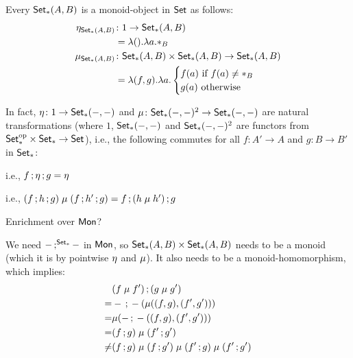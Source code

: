 \documentclass[runningheads,envcountsame]{llncs}
\begin{document}
Every $\mathsf{Set}_*(A, B)$ is a monoid-object in $\mathsf{Set}$ as follows:
\begin{align}
    \munit_{\homSetP{A}{B}} &\colon 1 \to \homSetP{A}{B} \\
                          &= \lambda (). \lambda a. *_B \\
    \mu_{\homSetP{A}{B}} &\colon \homSetP{A}{B} \times \homSetP{A}{B} \to \homSetP{A}{B} \\
                         &=
\lambda (f, g). \lambda a. \begin{cases}
    f(a) \mbox{ if } f(a) \neq *_B \\
    g(a) \mbox{ otherwise}
\end{cases}
\end{align}

In fact, $\munit\colon 1 \to \homSetP{-}{-}$ and $\mjoin\colon \homSetP{-}{-}^2 \to \homSetP{-}{-}$ are natural transformations (where $1$, $\mathsf{Set}_*(-, -)$ and $\mathsf{Set}_*(-, -)^2$ are functors from ${\mathsf{Set}_*^\mathrm{op}} \times \mathsf{Set}_* \to \mathsf{Set}$), i.e., the following commutes for all $f\colon A' \to A$ and $g\colon B \to B'$ in $\mathsf{Set}_*$:


i.e., $\comp{f}{\comp{\munit}{g}} = \munit$


i.e., $(\comp{f}{\comp{h}{g}}) \mathrel{\mjoin} (\comp{f}{\comp{h'}{g}}) = \comp{f}{\comp{(h \mathrel{\mjoin} h')}{g}}$

Enrichment over $\mathsf{Mon}$?

We need $\comp[\SetP]{-}{-}$ in $\mathsf{Mon}$, so $\mathsf{Set}_*(A, B) \times \mathsf{Set}_*(A, B)$ needs to be a monoid (which it is by pointwise $\munit$ and $\mjoin$). It also needs to be a monoid-homomorphism, which implies: 
\begin{align}
    & \comp{(f \mathrel{\mjoin} f')}{(g \mathrel{\mjoin} g')} \\
=   & \comp{-}{-}(\mjoin((f, g), (f', g'))) \\
=   & \mjoin(\comp{-}{-}((f, g), (f', g'))) \\
=   & (\comp{f}{g}) \mathrel{\mjoin} (\comp{f'}{g'}) \\
\neq & (\comp{f}{g}) \mathrel{\mjoin} (\comp{f}{g'}) \mathrel{\mjoin} (\comp{f'}{g}) \mathrel{\mjoin} (\comp{f'}{g'})
\end{align}
\end{document}

